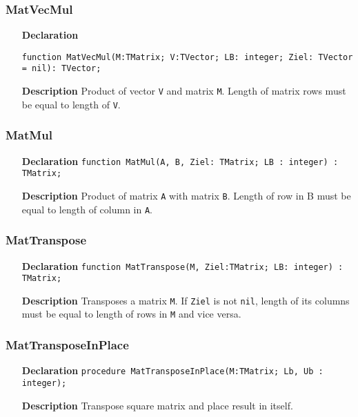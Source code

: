 \documentclass[12pt,a4paper,oneside]{report}
\newcommand{\declarationitem}[1]{\textbf{#1}}
\newcommand{\descriptiontitle}[1]{\textbf{#1}}
\newcommand{\code}[1]{\texttt{#1}}
\begin{document}
\subsubsection{MatVecMul}
\label{MatVecMul}
\begin{itemize}
	\item[\declarationitem{Declaration}\hfill]
	\begin{flushleft}
	\code{function MatVecMul(M:TMatrix; V:TVector; LB: integer; Ziel: TVector = nil): TVector;}
	\end{flushleft}
	\item[\descriptiontitle{Description}]Product of vector \code{V} and matrix \code{M}. Length of matrix rows must be equal to length of \code{V}.
\end{itemize}
\subsubsection{MatMul}
\label{MatMul}
\begin{itemize}
\item[\declarationitem{Declaration}\hfill]
\code{function MatMul(A, B, Ziel: TMatrix; LB : integer) : TMatrix;}
\item[\descriptiontitle{Description}] Product of matrix \code{A} with matrix \code{B}. Length of row in B must be equal to length of column in \code{A}.
\end{itemize}
\subsubsection{MatTranspose}
\label{MatTranspose}
\begin{itemize}
\item[\declarationitem{Declaration}\hfill]\code{function MatTranspose(M, Ziel:TMatrix; LB: integer) : TMatrix;}
\item[\descriptiontitle{Description}] Transposes a matrix \code{M}. If \code{Ziel} is not \code{nil}, length of its columns must be equal to length of rows in \code{M} and vice versa.
\end{itemize}
\subsubsection{MatTransposeInPlace}
\label{MatTransposeInPlace}
\begin{itemize}
\item[\declarationitem{Declaration}\hfill]\code{procedure MatTransposeInPlace(M:TMatrix; Lb, Ub : integer);}
\item[\descriptiontitle{Description}]Transpose square matrix and place result in itself.
\end{itemize}
\end{document}
